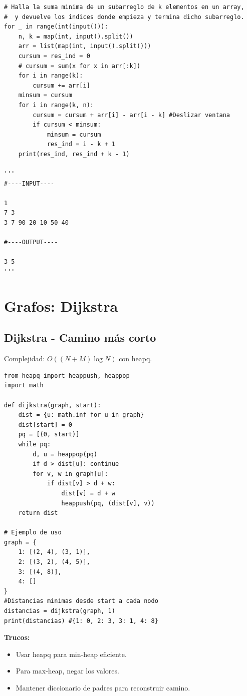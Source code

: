 \documentclass{article}
\begin{document}
\begin{lstlisting}[style=pythonstyle]
# Halla la suma minima de un subarreglo de k elementos en un array,
#  y devuelve los indices donde empieza y termina dicho subarreglo.
for _ in range(int(input())):
	n, k = map(int, input().split())
	arr = list(map(int, input().split()))
	cursum = res_ind = 0
	# cursum = sum(x for x in arr[:k])
	for i in range(k):
		cursum += arr[i]
	minsum = cursum
	for i in range(k, n):
		cursum = cursum + arr[i] - arr[i - k] #Deslizar ventana
		if cursum < minsum:
			minsum = cursum
			res_ind = i - k + 1
	print(res_ind, res_ind + k - 1)

'''
#----INPUT----

1
7 3
3 7 90 20 10 50 40

#----OUTPUT----

3 5
'''
\end{lstlisting}


\section{Grafos: Dijkstra}

\subsection{Dijkstra - Camino más corto}

Complejidad: \(O((N + M) \log N)\) con heapq.

\begin{lstlisting}[style=pythonstyle]
from heapq import heappush, heappop
import math

def dijkstra(graph, start):
    dist = {u: math.inf for u in graph}
    dist[start] = 0
    pq = [(0, start)]
    while pq:
        d, u = heappop(pq)
        if d > dist[u]: continue
        for v, w in graph[u]:
            if dist[v] > d + w:
                dist[v] = d + w
                heappush(pq, (dist[v], v))
    return dist

# Ejemplo de uso
graph = {
    1: [(2, 4), (3, 1)],
    2: [(3, 2), (4, 5)],
    3: [(4, 8)],
    4: []
}
#Distancias minimas desde start a cada nodo
distancias = dijkstra(graph, 1)
print(distancias) #{1: 0, 2: 3, 3: 1, 4: 8}
\end{lstlisting}

\textbf{Trucos:}
\begin{itemize}
  \item Usar heapq para min-heap eficiente.
  \item Para max-heap, negar los valores.
  \item Mantener diccionario de padres para reconstruir camino.
\end{itemize}
\end{document}
